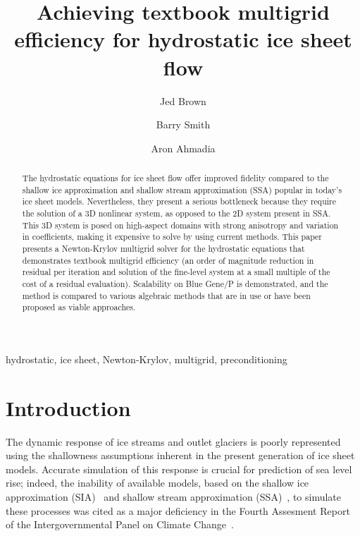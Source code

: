 \documentclass[3p]{elsarticle}
\begin{document}
\begin{frontmatter}
  \title{Achieving textbook multigrid efficiency for hydrostatic ice sheet flow}

  \author[vaw]{Jed Brown} 
  \author[mcs]{Barry Smith} 
  \author[kaust]{Aron Ahmadia} 

  \address[vaw]{Versuchsanstalt f\"ur Wasserbau, Hydrologie und Glaziologie (VAW), ETH Z\"urich, 8092     Z\"urich, Switzerland}
  \address[mcs]{Mathematics and Computer Science Division, Argonne National Laboratory, Argonne, IL     60439}
  \address[kaust]{KAUST-IBM Center for Deep Computing Research, Bldg \#1, Office 01-123,
    4700 King Abdullah University of Science and Technology,
    Thuwal Makkah 23955-6900,
    Kingdom of Saudi Arabia}

  \begin{abstract}
    The hydrostatic equations for ice sheet flow offer improved fidelity compared to the shallow ice approximation and shallow stream approximation (SSA) popular in today's ice sheet models. Nevertheless, they present a serious bottleneck because they require the solution of a 3D nonlinear system, as opposed to the 2D system present in SSA.  This 3D system is posed on high-aspect domains with strong anisotropy and variation in coefficients, making it expensive to solve by using current methods.  This paper presents a Newton-Krylov multigrid solver for the hydrostatic equations that demonstrates textbook multigrid efficiency (an order of magnitude reduction in residual per iteration and solution of the fine-level system at a small multiple of the cost of a residual evaluation).  Scalability on Blue Gene/P is demonstrated, and the method is compared to various algebraic methods that are in use or have been proposed as viable approaches.
  \end{abstract}
  \begin{keyword}
    hydrostatic, ice sheet, Newton-Krylov, multigrid, preconditioning
  \end{keyword}
  \thispagestyle{plain}
\end{frontmatter}

\section{Introduction}
The dynamic response of ice streams and outlet glaciers is poorly represented using the shallowness
assumptions inherent in the present generation of ice sheet models.  Accurate simulation of this
response is crucial for prediction of sea level rise; indeed, the inability of available models, based on
the shallow ice approximation (SIA)~\cite{hutter1983tgm} and shallow stream approximation
(SSA)~\cite{morland1987unconfined,weis1999theory}, to simulate these processes was cited as a major
deficiency in the Fourth Assesment Report of the Intergovernmental Panel on Climate Change~\cite{ipcc2007ar4-syr}.
\end{document}
